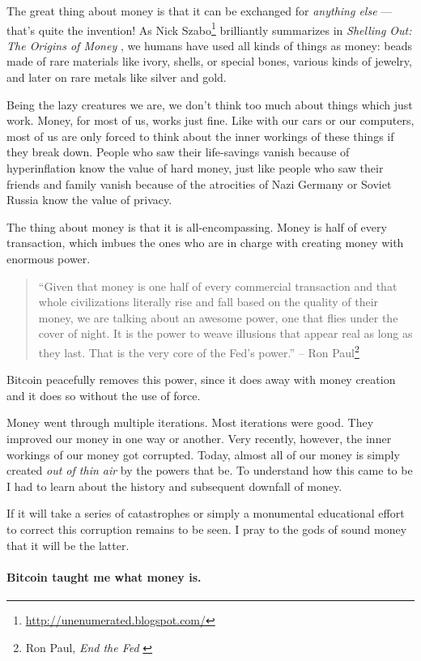 The great thing about money is that it can be exchanged for \textit{anything
else} --- that's quite the invention! As Nick Szabo\footnote{\url{http://unenumerated.blogspot.com/}} brilliantly
summarizes in \textit{Shelling Out: The Origins of Money} \cite{shelling-out}, we humans have
used all kinds of things as money: beads made of rare materials like
ivory, shells, or special bones, various kinds of jewelry, and later on
rare metals like silver and gold.

Being the lazy creatures we are, we don't think too much about things
which just work. Money, for most of us, works just fine. Like with our
cars or our computers, most of us are only forced to think about the
inner workings of these things if they break down. People who saw their
life-savings vanish because of hyperinflation know the value of hard
money, just like people who saw their friends and family vanish because
of the atrocities of Nazi Germany or Soviet Russia know the value of
privacy.

The thing about money is that it is all-encompassing. Money is half of
every transaction, which imbues the ones who are in charge with creating
money with enormous power.

\begin{samepage}\begin{quotation}
``Given that money is one half of every commercial transaction and that
whole civilizations literally rise and fall based on the quality of
their money, we are talking about an awesome power, one that flies
under the cover of night. It is the power to weave illusions that
appear real as long as they last. That is the very core of the
Fed's power.''
\flushright -- Ron Paul\footnote{Ron Paul, \textit{End the Fed} \cite{end-the-fed}}
\end{quotation}\end{samepage}

Bitcoin peacefully removes this power, since it does away with money
creation and it does so without the use of force.

Money went through multiple iterations. Most iterations were good. They
improved our money in one way or another. Very recently, however, the
inner workings of our money got corrupted. Today, almost all of our
money is simply created \textit{out of thin air} by the powers that be. To
understand how this came to be I had to learn about the history and
subsequent downfall of money.

If it will take a series of catastrophes or simply a monumental
educational effort to correct this corruption remains to be seen. I pray
to the gods of sound money that it will be the latter.

\paragraph{Bitcoin taught me what money is.}

%
%
%
%
